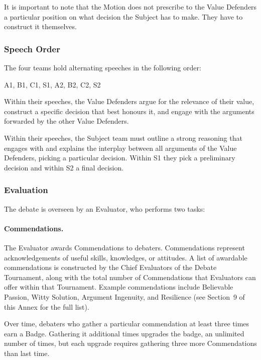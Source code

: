 \documentclass[12pt]{article}
\begin{document}
It is important to note that the Motion does not prescribe to the Value Defenders a particular position on what decision the Subject has to make. They have to construct it themselves.

\subsubsection{Speech Order}

The four teams hold alternating speeches in the following order:

\begin{center}
A1, B1, C1, S1, A2, B2, C2, S2
\end{center}

Within their speeches, the Value Defenders argue for the relevance of their value, construct a specific decision that best honours it, and engage with the arguments forwarded by the other Value Defenders.

Within their speeches, the Subject team must outline a strong reasoning that engages with and explains the interplay between all arguments of the Value Defenders, picking a particular decision. Within S1 they pick a preliminary decision and within S2 a final decision.

\subsubsection{Evaluation}

The debate is overseen by an Evaluator, who performs two tasks:

\paragraph{Commendations.} The Evaluator awards Commendations to debaters. Commendations represent acknowledgements of useful skills, knowledges, or attitudes. A list of awardable commendations is constructed by the Chief Evaluators of the Debate Tournament, along with the total number of Commendations that Evaluators can offer within that Tournament. Example commendations include Believable Passion, Witty Solution, Argument Ingenuity, and Resilience (see Section~9 of this Annex for the full list).

Over time, debaters who gather a particular commendation at least three times earn a Badge. Gathering it additional times upgrades the badge, an unlimited number of times, but each upgrade requires gathering three more Commendations than last time.
\end{document}
